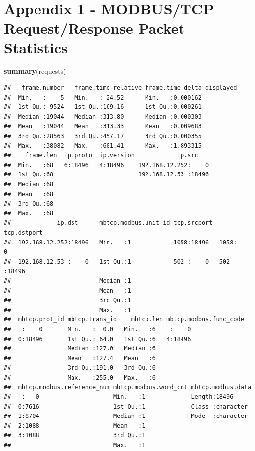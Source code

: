 \documentclass[]{article}
\newenvironment{Shaded}{\begin{snugshade}}{\end{snugshade}}
\newcommand{\KeywordTok}[1]{\textcolor[rgb]{0.13,0.29,0.53}{\textbf{{#1}}}}
\newcommand{\NormalTok}[1]{{#1}}
\begin{document}
\pagebreak

\section{Appendix 1 - MODBUS/TCP Request/Response Packet
Statistics}\label{appendix-1---modbustcp-requestresponse-packet-statistics}

\begin{Shaded}
\begin{Highlighting}[]
\KeywordTok{summary}\NormalTok{(requests)}
\end{Highlighting}
\end{Shaded}

\begin{verbatim}
##   frame.number   frame.time_relative frame.time_delta_displayed
##  Min.   :    5   Min.   : 24.52      Min.   :0.000162          
##  1st Qu.: 9524   1st Qu.:169.16      1st Qu.:0.000261          
##  Median :19044   Median :313.80      Median :0.000303          
##  Mean   :19044   Mean   :313.33      Mean   :0.009683          
##  3rd Qu.:28563   3rd Qu.:457.17      3rd Qu.:0.000355          
##  Max.   :38082   Max.   :601.41      Max.   :1.893315          
##    frame.len  ip.proto  ip.version            ip.src     
##  Min.   :68   6:18496   4:18496    192.168.12.252:    0  
##  1st Qu.:68                        192.168.12.53 :18496  
##  Median :68                                              
##  Mean   :68                                              
##  3rd Qu.:68                                              
##  Max.   :68                                              
##             ip.dst      mbtcp.modbus.unit_id tcp.srcport  tcp.dstport 
##  192.168.12.252:18496   Min.   :1            1058:18496   1058:    0  
##  192.168.12.53 :    0   1st Qu.:1            502 :    0   502 :18496  
##                         Median :1                                     
##                         Mean   :1                                     
##                         3rd Qu.:1                                     
##                         Max.   :1                                     
##  mbtcp.prot_id mbtcp.trans_id    mbtcp.len mbtcp.modbus.func_code
##   :    0       Min.   :  0.0   Min.   :6    :    0               
##  0:18496       1st Qu.: 64.0   1st Qu.:6   4:18496               
##                Median :127.0   Median :6                         
##                Mean   :127.4   Mean   :6                         
##                3rd Qu.:191.0   3rd Qu.:6                         
##                Max.   :255.0   Max.   :6                         
##  mbtcp.modbus.reference_num mbtcp.modbus.word_cnt mbtcp.modbus.data 
##   :   0                     Min.   :1             Length:18496      
##  0:7616                     1st Qu.:1             Class :character  
##  1:8704                     Median :1             Mode  :character  
##  2:1088                     Mean   :1                               
##  3:1088                     3rd Qu.:1                               
##                             Max.   :1
\end{verbatim}
\end{document}
